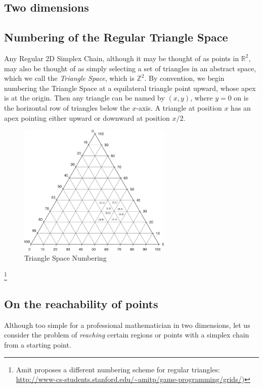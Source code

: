 \documentclass[11pt]{article}
\begin{document}
\subsection{Two dimensions}

\subsection{Numbering of the Regular Triangle Space}

Any Regular 2D Simplex Chain, although it may be thought of as points in $\mathbb{R}^2$, may also be thought of as simply
selecting a set of triangles in an abstract space, which we call the {\em Triangle Space}, which is $\mathbb{Z}^2$. By convention,
we begin numbering the Triangle Space at a equilateral triangle point upward, whose apex is at the origin.  Then any triangle can be
named by $(x,y)$, where $y=0$ on is the horizontal row of triangles below the $x$-axis. A triangle at position $x$ has an apex
pointing either upward or downward at position $x/2$.

\begin{figure}
     \centering
     \includegraphics[width=0.65\textwidth]{figures/Triangle_Plot_-_Major_grid_lines.png}
     \caption{Triangle Space Numbering}
  \label{fig:equitetrabeam}
\end{figure}

\footnote{ Amit proposes a different numbering scheme for regular triangles:
  \url{http://www-cs-students.stanford.edu/~amitp/game-programming/grids/})
}

\subsection{On the reachability of points}

Although too simple for a professional mathematician in two dimensions, let us consider the problem of {\em reaching} certain regions
or points with a simplex chain from a starting point.
\end{document}

